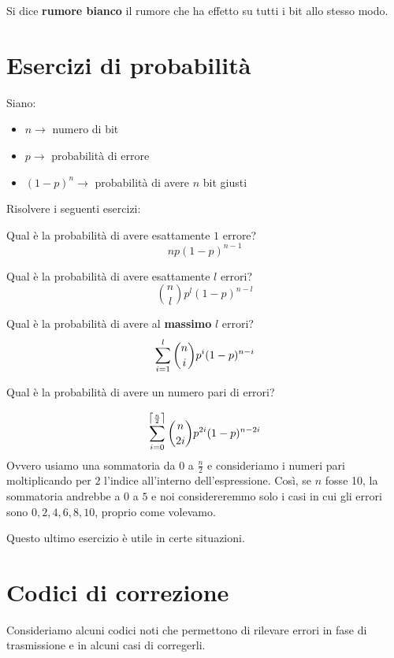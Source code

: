 \documentclass[12pt]{report}
\begin{document}
    \begin{defi}
        Si dice \textbf{rumore bianco} il rumore che ha effetto su tutti i bit allo stesso modo.
    \end{defi}

    \section{Esercizi di probabilità}

    Siano:

    \begin{itemize}
        \item $n \rightarrow$ numero di bit
        \item $p \rightarrow$ probabilità di errore
        \item $(1-p)^n \rightarrow$ probabilità di avere $n$ bit giusti
    \end{itemize}
    Risolvere i seguenti esercizi:

    \begin{es}
        Qual è la probabilità di avere esattamente $1$ errore?
        $$np (1-p)^{n-1}$$
    \end{es}

    \begin{es}
        Qual è la probabilità di avere esattamente $l$ errori?
        $$\binom{n}{l}p^l (1-p)^{n-l}$$
    \end{es}

    \begin{es}
        Qual è la probabilità di avere al \textbf{massimo} $l$ errori?
        $$\sum_{i=1}^{l} \binom{n}{i}p^i (1-p)^{n-i}$$
    \end{es}

    \begin{es}
        Qual è la probabilità di avere un numero pari di errori?

        $$\sum_{i = 0}^{\left\lceil \frac{n}{2} \right\rceil} \binom{n}{2i}p^{2i} (1-p)^{n-2i}$$
        Ovvero usiamo una sommatoria da $0$ a $\frac{n}{2}$ e consideriamo i numeri pari moltiplicando per $2$ l'indice all'interno dell'espressione. Così, se $n$ fosse 10, la sommatoria andrebbe a $0$ a $5$ e noi considereremmo solo i casi in cui gli errori sono $0,2,4,6,8,10$, proprio come volevamo.
    \end{es}

    \noindent
    Questo ultimo esercizio è utile in certe situazioni.

    \section{Codici di correzione}
    Consideriamo alcuni codici noti che permettono di rilevare errori in fase di trasmissione e in alcuni casi di corregerli.
\end{document}
